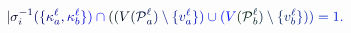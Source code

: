 \documentclass[12pt]{article}
\begin{document}
\makeatletter
\renewcommand*{\@textcolor}[3]{%
  \protect\leavevmode
  \begingroup
    \color#1{#2}#3%
  \endgroup
}
\makeatother
\begin{displaymath}
\mathcolor[RGB]{0,0,15}{|} \mathcolor[RGB]{0,0,30}{\sigma} _ { \mathcolor[RGB]{0,0,45}{i} } ^ { \mathcolor[RGB]{0,0,60}{-} \mathcolor[RGB]{0,0,75}{1} } \mathcolor[RGB]{0,0,90}{(} \mathcolor[RGB]{0,0,105}{\{} \mathcolor[RGB]{0,0,120}{\kappa} _ { \mathcolor[RGB]{0,0,135}{a} } ^ { \mathcolor[RGB]{0,0,150}{\ell} } \mathcolor[RGB]{0,0,165}{,} \mathcolor[RGB]{0,0,180}{\kappa} _ { \mathcolor[RGB]{0,0,195}{b} } ^ { \mathcolor[RGB]{0,0,210}{\ell} } \mathcolor[RGB]{0,0,225}{\}} \mathcolor[RGB]{0,0,240}{)} \mathcolor[RGB]{0,0,255}{\cap} \mathcolor[RGB]{0,15,0}{(} \mathcolor[RGB]{0,15,15}{(} \mathcolor[RGB]{0,15,30}{V} \mathcolor[RGB]{0,15,45}{(} \mathcal { \mathcolor[RGB]{0,15,60}{P} } _ { \mathcolor[RGB]{0,15,75}{a} } ^ { \mathcolor[RGB]{0,15,90}{\ell} } \mathcolor[RGB]{0,15,105}{)} \mathcolor[RGB]{0,15,120}{\setminus} \mathcolor[RGB]{0,15,135}{\{} \mathcolor[RGB]{0,15,150}{v} _ { \mathcolor[RGB]{0,15,165}{a} } ^ { \mathcolor[RGB]{0,15,180}{\ell} } \mathcolor[RGB]{0,15,195}{\}} \mathcolor[RGB]{0,15,210}{)} \mathcolor[RGB]{0,15,225}{\cup} \mathcolor[RGB]{0,15,240}{(} \mathcolor[RGB]{0,15,255}{V} \mathcolor[RGB]{0,30,0}{(} \mathcal { \mathcolor[RGB]{0,30,15}{P} } _ { \mathcolor[RGB]{0,30,30}{b} } ^ { \mathcolor[RGB]{0,30,45}{\ell} } \mathcolor[RGB]{0,30,60}{)} \mathcolor[RGB]{0,30,75}{\setminus} \mathcolor[RGB]{0,30,90}{\{} \mathcolor[RGB]{0,30,105}{v} _ { \mathcolor[RGB]{0,30,120}{b} } ^ { \mathcolor[RGB]{0,30,135}{\ell} } \mathcolor[RGB]{0,30,150}{\}} \mathcolor[RGB]{0,30,165}{)} \mathcolor[RGB]{0,30,180}{)} \mathcolor[RGB]{0,30,195}{=} \mathcolor[RGB]{0,30,210}{1} \mathcolor[RGB]{0,30,225}{.}
\end{displaymath}
\end{document}
